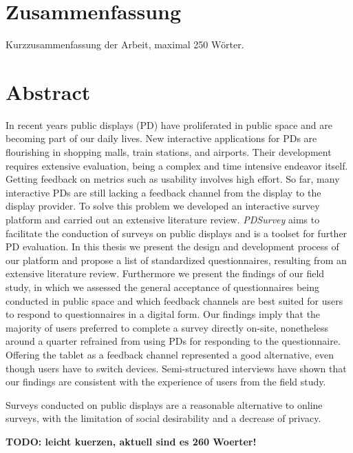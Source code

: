
\section*{Zusammenfassung}

	Kurzzusammenfassung der Arbeit, maximal 250 W\"orter.

\section*{Abstract}

	In recent years public displays (PD) have proliferated in public space and are becoming part of our daily lives. New interactive applications for PDs are flourishing in shopping malls, train stations, and airports. Their development requires extensive evaluation, being a complex and time intensive endeavor itself. Getting feedback on metrics such as usability involves high effort. So far, many interactive PDs are still lacking a feedback channel from the display to the display provider. To solve this problem we developed an interactive survey platform and carried out an extensive literature review.
	\textit{PDSurvey} aims to facilitate the conduction of surveys on public displays and is a toolset for further PD evaluation. In this thesis we present the design and development process of our platform and propose a list of standardized questionnaires, resulting from an extensive literature review. Furthermore we present the findings of our field study, in which we assessed the general acceptance of questionnaires being conducted in public space and which feedback channels are best suited for users to respond to questionnaires in a digital form.
	Our findings imply that the majority of users preferred to complete a survey directly on-site, nonetheless around a quarter refrained from using PDs for responding to the questionnaire. Offering the tablet as a feedback channel represented a good alternative, even though users have to switch devices. Semi-structured interviews have shown that our findings are consistent with the experience of users from the field study.

	Surveys conducted on public displays are a reasonable alternative to online surveys, with the limitation of social desirability and a decrease of privacy.

	\textbf{TODO: leicht kuerzen, aktuell sind es 260 Woerter!}
	





